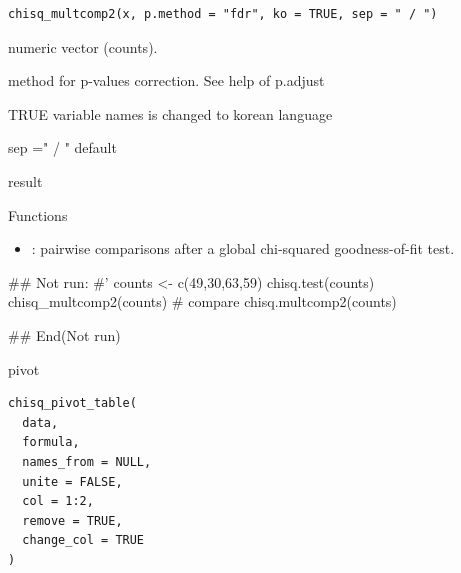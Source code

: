 \documentclass[a4paper]{book}
\begin{document}
%
\begin{Usage}
\begin{verbatim}
chisq_multcomp2(x, p.method = "fdr", ko = TRUE, sep = " / ")
\end{verbatim}
\end{Usage}
%
\begin{Arguments}
\begin{ldescription}
\item[\code{x}] numeric vector (counts).

\item[\code{p.method}] method for p-values correction. See help of p.adjust

\item[\code{ko}] TRUE variable names is changed to korean language

\item[\code{sep}] sep =" / " default
\end{ldescription}
\end{Arguments}
%
\begin{Value}
result
\end{Value}
%
\begin{Section}{Functions}
\begin{itemize}

\item{} : pairwise comparisons after a global chi-squared goodness-of-fit test.


\end{itemize}
\end{Section}
%
\begin{Examples}
\begin{ExampleCode}
\#\# Not run: 
#'
counts <- c(49,30,63,59)
chisq.test(counts)
chisq_multcomp2(counts)
# compare
chisq.multcomp2(counts)


## End(Not run)
\end{ExampleCode}
\end{Examples}
%
\begin{Description}
pivot
\end{Description}
%
\begin{Usage}
\begin{verbatim}
chisq_pivot_table(
  data,
  formula,
  names_from = NULL,
  unite = FALSE,
  col = 1:2,
  remove = TRUE,
  change_col = TRUE
)
\end{verbatim}
\end{Usage}
%
\end{document}
